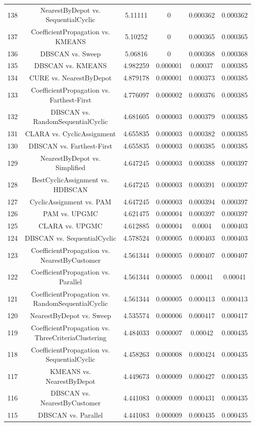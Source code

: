 \documentclass[a4paper,10pt]{article}
\begin{document}
\begin{landscape}
\begin{table}[!htp]
\begin{tabular}{cccccc}
138&NearestByDepot vs. SequentialCyclic&5.11111&0&0.000362&0.000362\\
137&CoefficientPropagation vs. KMEANS&5.10252&0&0.000365&0.000365\\
136&DBSCAN vs. Sweep&5.06816&0&0.000368&0.000368\\
135&DBSCAN vs. KMEANS&4.982259&0.000001&0.00037&0.000385\\
134&CURE vs. NearestByDepot&4.879178&0.000001&0.000373&0.000385\\
133&CoefficientPropagation vs. Farthest-First&4.776097&0.000002&0.000376&0.000385\\
132&DBSCAN vs. RandomSequentialCyclic&4.681605&0.000003&0.000379&0.000385\\
131&CLARA vs. CyclicAssignment&4.655835&0.000003&0.000382&0.000385\\
130&DBSCAN vs. Farthest-First&4.655835&0.000003&0.000385&0.000385\\
129&NearestByDepot vs. Simplified&4.647245&0.000003&0.000388&0.000397\\
128&BestCyclicAssignment vs. HDBSCAN&4.647245&0.000003&0.000391&0.000397\\
127&CyclicAssignment vs. PAM&4.647245&0.000003&0.000394&0.000397\\
126&PAM vs. UPGMC&4.621475&0.000004&0.000397&0.000397\\
125&CLARA vs. UPGMC&4.612885&0.000004&0.0004&0.000403\\
124&DBSCAN vs. SequentialCyclic&4.578524&0.000005&0.000403&0.000403\\
123&CoefficientPropagation vs. NearestByCustomer&4.561344&0.000005&0.000407&0.000407\\
122&CoefficientPropagation vs. Parallel&4.561344&0.000005&0.00041&0.00041\\
121&CoefficientPropagation vs. RandomSequentialCyclic&4.561344&0.000005&0.000413&0.000413\\
120&NearestByDepot vs. Sweep&4.535574&0.000006&0.000417&0.000417\\
119&CoefficientPropagation vs. ThreeCriteriaClustering&4.484033&0.000007&0.00042&0.000435\\
118&CoefficientPropagation vs. SequentialCyclic&4.458263&0.000008&0.000424&0.000435\\
117&KMEANS vs. NearestByDepot&4.449673&0.000009&0.000427&0.000435\\
116&DBSCAN vs. NearestByCustomer&4.441083&0.000009&0.000431&0.000435\\
115&DBSCAN vs. Parallel&4.441083&0.000009&0.000435&0.000435\\

\end{tabular}
\end{table}
\end{landscape}
\end{document}
